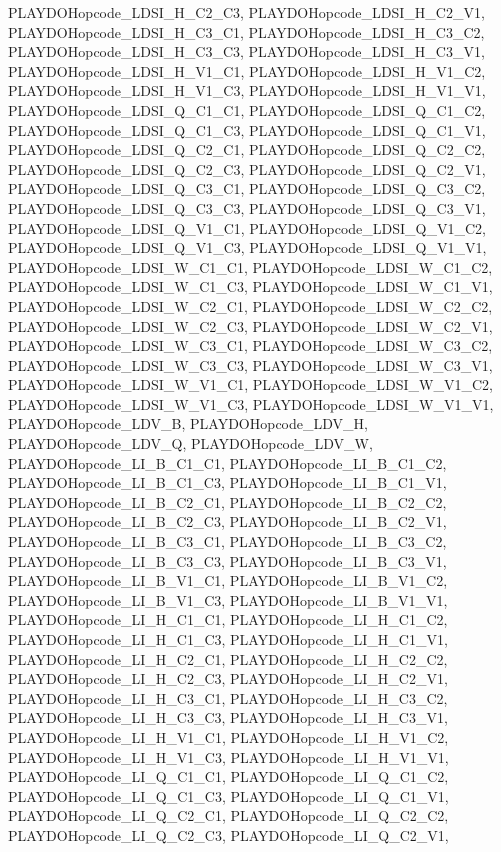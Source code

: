 PLAYDOHopcode\_\-LDSI\_\-H\_\-C2\_\-C3, PLAYDOHopcode\_\-LDSI\_\-H\_\-C2\_\-V1, PLAYDOHopcode\_\-LDSI\_\-H\_\-C3\_\-C1, PLAYDOHopcode\_\-LDSI\_\-H\_\-C3\_\-C2, PLAYDOHopcode\_\-LDSI\_\-H\_\-C3\_\-C3, PLAYDOHopcode\_\-LDSI\_\-H\_\-C3\_\-V1, PLAYDOHopcode\_\-LDSI\_\-H\_\-V1\_\-C1, PLAYDOHopcode\_\-LDSI\_\-H\_\-V1\_\-C2, PLAYDOHopcode\_\-LDSI\_\-H\_\-V1\_\-C3, PLAYDOHopcode\_\-LDSI\_\-H\_\-V1\_\-V1, PLAYDOHopcode\_\-LDSI\_\-Q\_\-C1\_\-C1, PLAYDOHopcode\_\-LDSI\_\-Q\_\-C1\_\-C2, PLAYDOHopcode\_\-LDSI\_\-Q\_\-C1\_\-C3, PLAYDOHopcode\_\-LDSI\_\-Q\_\-C1\_\-V1, PLAYDOHopcode\_\-LDSI\_\-Q\_\-C2\_\-C1, PLAYDOHopcode\_\-LDSI\_\-Q\_\-C2\_\-C2, PLAYDOHopcode\_\-LDSI\_\-Q\_\-C2\_\-C3, PLAYDOHopcode\_\-LDSI\_\-Q\_\-C2\_\-V1, PLAYDOHopcode\_\-LDSI\_\-Q\_\-C3\_\-C1, PLAYDOHopcode\_\-LDSI\_\-Q\_\-C3\_\-C2, PLAYDOHopcode\_\-LDSI\_\-Q\_\-C3\_\-C3, PLAYDOHopcode\_\-LDSI\_\-Q\_\-C3\_\-V1, PLAYDOHopcode\_\-LDSI\_\-Q\_\-V1\_\-C1, PLAYDOHopcode\_\-LDSI\_\-Q\_\-V1\_\-C2, PLAYDOHopcode\_\-LDSI\_\-Q\_\-V1\_\-C3, PLAYDOHopcode\_\-LDSI\_\-Q\_\-V1\_\-V1, PLAYDOHopcode\_\-LDSI\_\-W\_\-C1\_\-C1, PLAYDOHopcode\_\-LDSI\_\-W\_\-C1\_\-C2, PLAYDOHopcode\_\-LDSI\_\-W\_\-C1\_\-C3, PLAYDOHopcode\_\-LDSI\_\-W\_\-C1\_\-V1, PLAYDOHopcode\_\-LDSI\_\-W\_\-C2\_\-C1, PLAYDOHopcode\_\-LDSI\_\-W\_\-C2\_\-C2, PLAYDOHopcode\_\-LDSI\_\-W\_\-C2\_\-C3, PLAYDOHopcode\_\-LDSI\_\-W\_\-C2\_\-V1, PLAYDOHopcode\_\-LDSI\_\-W\_\-C3\_\-C1, PLAYDOHopcode\_\-LDSI\_\-W\_\-C3\_\-C2, PLAYDOHopcode\_\-LDSI\_\-W\_\-C3\_\-C3, PLAYDOHopcode\_\-LDSI\_\-W\_\-C3\_\-V1, PLAYDOHopcode\_\-LDSI\_\-W\_\-V1\_\-C1, PLAYDOHopcode\_\-LDSI\_\-W\_\-V1\_\-C2, PLAYDOHopcode\_\-LDSI\_\-W\_\-V1\_\-C3, PLAYDOHopcode\_\-LDSI\_\-W\_\-V1\_\-V1, PLAYDOHopcode\_\-LDV\_\-B, PLAYDOHopcode\_\-LDV\_\-H, PLAYDOHopcode\_\-LDV\_\-Q, PLAYDOHopcode\_\-LDV\_\-W, PLAYDOHopcode\_\-LI\_\-B\_\-C1\_\-C1, PLAYDOHopcode\_\-LI\_\-B\_\-C1\_\-C2, PLAYDOHopcode\_\-LI\_\-B\_\-C1\_\-C3, PLAYDOHopcode\_\-LI\_\-B\_\-C1\_\-V1, PLAYDOHopcode\_\-LI\_\-B\_\-C2\_\-C1, PLAYDOHopcode\_\-LI\_\-B\_\-C2\_\-C2, PLAYDOHopcode\_\-LI\_\-B\_\-C2\_\-C3, PLAYDOHopcode\_\-LI\_\-B\_\-C2\_\-V1, PLAYDOHopcode\_\-LI\_\-B\_\-C3\_\-C1, PLAYDOHopcode\_\-LI\_\-B\_\-C3\_\-C2, PLAYDOHopcode\_\-LI\_\-B\_\-C3\_\-C3, PLAYDOHopcode\_\-LI\_\-B\_\-C3\_\-V1, PLAYDOHopcode\_\-LI\_\-B\_\-V1\_\-C1, PLAYDOHopcode\_\-LI\_\-B\_\-V1\_\-C2, PLAYDOHopcode\_\-LI\_\-B\_\-V1\_\-C3, PLAYDOHopcode\_\-LI\_\-B\_\-V1\_\-V1, PLAYDOHopcode\_\-LI\_\-H\_\-C1\_\-C1, PLAYDOHopcode\_\-LI\_\-H\_\-C1\_\-C2, PLAYDOHopcode\_\-LI\_\-H\_\-C1\_\-C3, PLAYDOHopcode\_\-LI\_\-H\_\-C1\_\-V1, PLAYDOHopcode\_\-LI\_\-H\_\-C2\_\-C1, PLAYDOHopcode\_\-LI\_\-H\_\-C2\_\-C2, PLAYDOHopcode\_\-LI\_\-H\_\-C2\_\-C3, PLAYDOHopcode\_\-LI\_\-H\_\-C2\_\-V1, PLAYDOHopcode\_\-LI\_\-H\_\-C3\_\-C1, PLAYDOHopcode\_\-LI\_\-H\_\-C3\_\-C2, PLAYDOHopcode\_\-LI\_\-H\_\-C3\_\-C3, PLAYDOHopcode\_\-LI\_\-H\_\-C3\_\-V1, PLAYDOHopcode\_\-LI\_\-H\_\-V1\_\-C1, PLAYDOHopcode\_\-LI\_\-H\_\-V1\_\-C2, PLAYDOHopcode\_\-LI\_\-H\_\-V1\_\-C3, PLAYDOHopcode\_\-LI\_\-H\_\-V1\_\-V1, PLAYDOHopcode\_\-LI\_\-Q\_\-C1\_\-C1, PLAYDOHopcode\_\-LI\_\-Q\_\-C1\_\-C2, PLAYDOHopcode\_\-LI\_\-Q\_\-C1\_\-C3, PLAYDOHopcode\_\-LI\_\-Q\_\-C1\_\-V1, PLAYDOHopcode\_\-LI\_\-Q\_\-C2\_\-C1, PLAYDOHopcode\_\-LI\_\-Q\_\-C2\_\-C2, PLAYDOHopcode\_\-LI\_\-Q\_\-C2\_\-C3, PLAYDOHopcode\_\-LI\_\-Q\_\-C2\_\-V1, 